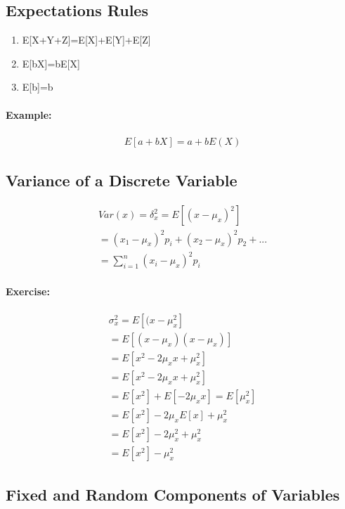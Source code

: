 \subsection{Expectations Rules}
\begin{enumerate}[(1)]
\item E[X+Y+Z]=E[X]+E[Y]+E[Z]
\item E[bX]=bE[X]
\item E[b]=b
\end{enumerate}
\paragraph{Example:}
\begin{eqnarray*}
E[a+bX]=a+bE(X)
\end{eqnarray*}

\subsection{Variance of a Discrete Variable}
\begin{eqnarray}
Var(x)=\delta_{x}^{2}=E[(x-\mu_{x})^{2}]\\
=(x_{1}-\mu_{x})^{2}p_{i}+(x_{2}-\mu_{x})^{2}p_{2}+...\\
=\sum_{i=1}^{n}(x_{i}-\mu_{x})^{2}p_{i}
\end{eqnarray}
\paragraph{Exercise:}
\begin{eqnarray*}
\sigma_{x}^{2}=E[(x-\mu_{x}^{2}]\\
=E[(x-\mu_{x})(x-\mu_{x})]\\
=E[x^{2}-2\mu_{x}x+\mu_{x}^2]\\
=E[x^{2}-2\mu_{x}x+\mu_{x}^2]\\
=E[x^{2}]+E[-2\mu_{x}x]=E[\mu_{x}^{2}]\\
=E[x^{2}]-2\mu_{x}E[x]+\mu_{x}^{2}\\
=E[x^{2}]-2\mu_{x}^{2}+\mu_{x}^{2}\\
=E[x^{2}]-\mu_{x}^{2}
\end{eqnarray*}

\subsection{Fixed and Random Components of Variables}
